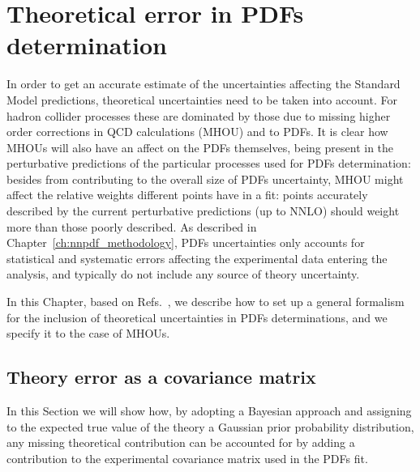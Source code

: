 \chapter{Theoretical error in PDFs determination}
\label{sec:th_error}
In order to get an accurate estimate of the uncertainties affecting the Standard Model predictions, theoretical 
uncertainties need to be taken into account. 
For hadron collider processes these are dominated by those due to missing higher order corrections in QCD calculations
(MHOU) and to PDFs. 
It is clear how MHOUs will also have an affect on the PDFs themselves, being present in the perturbative predictions
of the particular processes used for PDFs determination: besides from contributing to the overall
size of PDFs uncertainty, MHOU might affect the relative weights different points have in a fit:
points accurately described by the current perturbative predictions (up to NNLO) should weight more
than those poorly described. 
%
As described in Chapter~\ref{ch:nnpdf_methodology}, PDFs uncertainties only accounts for statistical and 
systematic errors affecting the experimental data entering the analysis, and typically do not include any source 
of theory uncertainty.

%
In this Chapter, based on Refs.~\cite{AbdulKhalek:2019bux,AbdulKhalek:2019ihb}, we describe how to set up 
a general formalism for the inclusion of theoretical uncertainties in PDFs determinations,
 and we specify it to the case of MHOUs.

 \section{Theory error as a covariance matrix}
 In this Section we will show how, by adopting a Bayesian approach and assigning to the 
 expected true value of the theory a Gaussian prior probability distribution, any missing theoretical
 contribution can be accounted for by adding a contribution to the experimental covariance matrix used in the PDFs fit.


